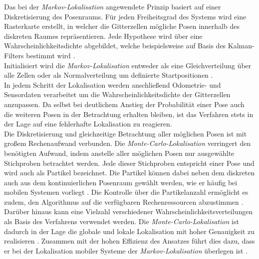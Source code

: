 Das bei der \textit{Markov-Lokalisation} angewendete Prinzip basiert auf einer Diskretisierung des Posenraums. Für jeden Freiheitsgrad des Systems wird eine Rasterkarte erstellt, in welcher die Gitterzellen mögliche Posen innerhalb des diskreten Raumes repräsentieren. Jede Hypothese wird über eine Wahrscheinlichkeitsdichte abgebildet, welche beispielsweise auf Basis des Kalman-Filters bestimmt wird \cite{Hertzberg2012}.\\
Initialisiert wird die \textit{Markov-Lokalisation} entweder als eine Gleichverteilung über alle Zellen oder als Normalverteilung um definierte Startpositionen \cite{Hertzberg2012}.\\
In jedem Schritt der Lokalisation werden anschließend Odometrie- und Sensordaten verarbeitet um die Wahrscheinlichkeitsdichte der Gitterzellen anzupassen. Da selbst bei deutlichem Anstieg der Probabilität einer Pose auch die weiteren Posen in der Betrachtung erhalten bleiben, ist das Verfahren stets in der Lage auf eine fehlerhafte Lokalisation zu reagieren.\\


Die Diskretisierung und gleichzeitige Betrachtung aller möglichen Posen ist mit großem Rechenaufwand verbunden. Die \textit{Monte-Carlo-Lokalisation} verringert den benötigten Aufwand, indem anstelle aller möglichen Posen nur ausgewählte Stichproben betrachtet werden. Jede dieser Stichproben entspricht einer Pose und wird auch als Partikel bezeichnet. Die Partikel können dabei neben dem diskreten auch aus dem kontinuierlichen Posenraum gewählt werden, wie er häufig bei mobilen Systemen vorliegt \cite{Fox2001}. Die Kontrolle über die Partikelanzahl ermöglicht es zudem, den Algorithmus auf die verfügbaren Rechenressourcen abzustimmen \cite{Thrun2001}.\\
Darüber hinaus kann eine Vielzahl verschiedener Wahrscheinlichkeitsverteilungen als Basis des Verfahrens verwendet werden. Die \textit{Monte-Carlo-Lokalisation} ist dadurch in der Lage die globale und lokale Lokalisation mit hoher Genauigkeit zu realisieren \cite{Thrun2005}. Zusammen mit der hohen Effizienz des Ansatzes führt dies dazu, dass er bei der Lokalisation mobiler Systeme der \textit{Markov-Lokalisation} überlegen ist \cite{Fox2001}.

